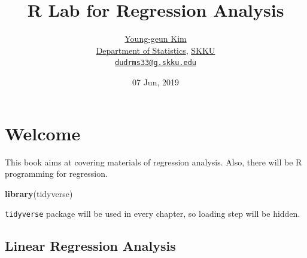 \documentclass[]{book}
\title{R Lab for Regression Analysis}
\author{\href{https://github.com/ygeunkim}{Young-geun Kim}\\
\href{https://stat.skku.edu/stat/index.jsp}{Department of Statistics}, \href{https://www.skku.edu/skku/index.do}{SKKU}\\
\href{mailto:dudrms33@g.skku.edu}{\nolinkurl{dudrms33@g.skku.edu}}}
\date{07 Jun, 2019}
\newenvironment{Shaded}{\begin{snugshade}}{\end{snugshade}}
\newcommand{\CommentTok}[1]{\textcolor[rgb]{0.56,0.35,0.01}{\textit{#1}}}
\newcommand{\DataTypeTok}[1]{\textcolor[rgb]{0.13,0.29,0.53}{#1}}
\newcommand{\KeywordTok}[1]{\textcolor[rgb]{0.13,0.29,0.53}{\textbf{#1}}}
\newcommand{\NormalTok}[1]{#1}
\newcommand{\OperatorTok}[1]{\textcolor[rgb]{0.81,0.36,0.00}{\textbf{#1}}}
\newcommand{\StringTok}[1]{\textcolor[rgb]{0.31,0.60,0.02}{#1}}
\let\oldmaketitle\maketitle
\theoremstyle{definition}
\theoremstyle{definition}
\theoremstyle{definition}
\theoremstyle{remark}
\begin{document}
\maketitle

\begin{titlepage}
  
\end{titlepage}

\let\maketitle\oldmaketitle
\maketitle

{
\setcounter{tocdepth}{1}
\tableofcontents
}
\hypertarget{welcome}{%
\chapter*{Welcome}\label{welcome}}

This book aims at covering materials of regression analysis. Also, there will be R programming for regression.

\begin{Shaded}
\begin{Highlighting}[]
\KeywordTok{library}\NormalTok{(tidyverse)}
\end{Highlighting}
\end{Shaded}

\texttt{tidyverse} package will be used in every chapter, so loading step will be hidden.

\hypertarget{linear-regression-analysis}{%
\section*{Linear Regression Analysis}\label{linear-regression-analysis}}

\begin{Shaded}
\end{Shaded}
\end{document}
